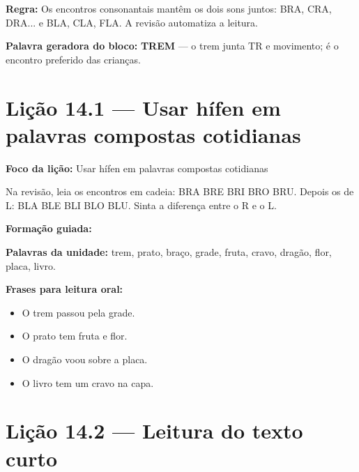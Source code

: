 \textbf{Regra:} Os encontros consonantais mantêm os dois sons juntos: BRA, CRA, DRA... e BLA, CLA, FLA. A revisão automatiza a leitura.

\textbf{Palavra geradora do bloco:} \textbf{TREM} --- o trem junta TR e movimento; é o encontro preferido das crianças.

\section{Lição 14.1 --- Usar hífen em palavras compostas cotidianas}

\textbf{Foco da lição:} Usar hífen em palavras compostas cotidianas


\begin{boquinha}
Na revisão, leia os encontros em cadeia: BRA BRE BRI BRO BRU. Depois os de L: BLA BLE BLI BLO BLU. Sinta a diferença entre o R e o L.
\end{boquinha}

\noindent\textbf{Formação guiada:}

\begin{center}
\end{center}

\noindent\textbf{Palavras da unidade:} trem, prato, braço, grade, fruta, cravo, dragão, flor, placa, livro.

\noindent\textbf{Frases para leitura oral:}
\begin{itemize}[leftmargin=1.6em]
  \item O trem passou pela grade.
  \item O prato tem fruta e flor.
  \item O dragão voou sobre a placa.
  \item O livro tem um cravo na capa.
\end{itemize}

\section{Lição 14.2 --- Leitura do texto curto}

